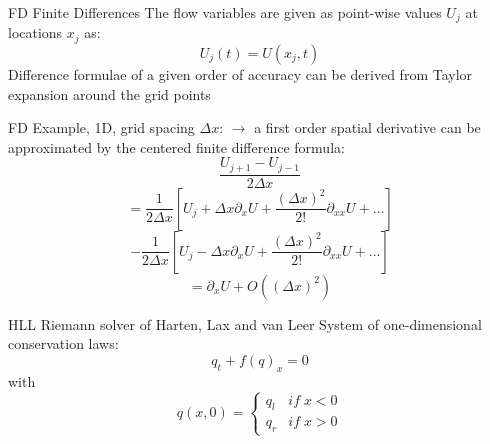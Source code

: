 \begin{frame}{FD}
	Finite Differences \newline
	The flow variables are given as point-wise values $U_j$ at locations $x_j$ as:
	\begin{equation*}
	U_j(t) = U(x_j,t)
	\end{equation*}
	Difference formulae of a given order of accuracy can be derived from Taylor expansion around the grid points \newline
	
\end{frame}

\begin{frame}{FD}
	Example, 1D, grid spacing $\Delta x$: \newline
	$\rightarrow$ a first order spatial derivative can be approximated by the centered finite difference formula:
	\begin{equation*}
	\frac{U_{j+1}-U_{j-1}}{2 \Delta x} 
	\end{equation*}
	\begin{equation*}
	= \frac{1}{2 \Delta x} \left[ U_j + \Delta x \partial_x U + \frac{(\Delta x)^2}{2!} \partial_{xx} U + \ldots	 \right]	
	\end{equation*}
	\begin{equation*}
	- 	\frac{1}{2 \Delta x} \left[ U_j - \Delta x \partial_x U + \frac{(\Delta x)^2}{2!} \partial_{xx} U + \ldots	 \right] 
	\end{equation*}
	\begin{equation*}
	= \partial_x U + O((\Delta x)^2)
	\end{equation*}
\end{frame}


\begin{frame}{HLL}
	Riemann solver of Harten, Lax and van Leer \newline
	System of one-dimensional conservation laws:
	\begin{equation*}
	q_t + f(q)_x = 0
	\end{equation*}
	with
	\begin{equation*}
	q(x,0) = \left\{ \begin{matrix} q_l & if \; x < 0 \\ q_r & if \; x > 0 \end{matrix}\right.
	\end{equation*}
\end{frame}

